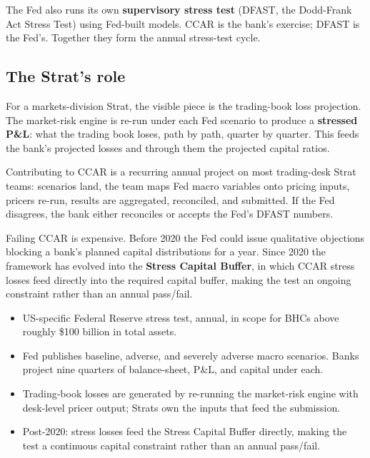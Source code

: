 The Fed also runs its own \textbf{supervisory stress test}
(DFAST, the Dodd-Frank Act Stress Test) using Fed-built models.
CCAR is the bank's exercise; DFAST is the Fed's.  Together they
form the annual stress-test cycle.

\subsection{The Strat's role}

For a markets-division Strat, the visible piece is the
trading-book loss projection.  The market-risk engine is re-run
under each Fed scenario to produce a \textbf{stressed P\&L}: what
the trading book loses, path by path, quarter by quarter.  This
feeds the bank's projected losses and through them the projected
capital ratios.

Contributing to CCAR is a recurring annual project on most
trading-desk Strat teams: scenarios land, the team maps Fed macro
variables onto pricing inputs, pricers re-run, results are
aggregated, reconciled, and submitted.  If the Fed disagrees, the
bank either reconciles or accepts the Fed's DFAST numbers.

Failing CCAR is expensive.  Before 2020 the Fed could issue
qualitative objections blocking a bank's planned capital
distributions for a year.  Since 2020 the framework has evolved
into the \textbf{Stress Capital Buffer}, in which CCAR stress
losses feed directly into the required capital buffer, making the
test an ongoing constraint rather than an annual pass/fail.

\begin{keyfactbox}
\begin{itemize}
  \item US-specific Federal Reserve stress test, annual, in
    scope for BHCs above roughly \$100 billion in total assets.
  \item Fed publishes baseline, adverse, and severely adverse
    macro scenarios.  Banks project nine quarters of
    balance-sheet, P\&L, and capital under each.
  \item Trading-book losses are generated by re-running the
    market-risk engine with desk-level pricer output; Strats
    own the inputs that feed the submission.
  \item Post-2020: stress losses feed the Stress Capital
    Buffer directly, making the test a continuous capital
    constraint rather than an annual pass/fail.
\end{itemize}
\end{keyfactbox}


